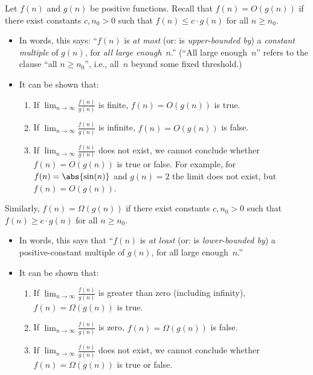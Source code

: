 \documentclass[11pt,addpoints,answers]{exam}
\begin{document}
\begin{questions}
  Let $f(n)$ and $g(n)$ be positive functions.
  Recall that $f(n) = O(g(n))$ if there exist constants $c, n_0 > 0$ such that $f(n) \leq c \cdot g(n)$ for all $n \geq n_0$.

  \begin{itemize}
    \item In words, this says: ``$f(n)$ is \emph{at most} (or: is \emph{upper-bounded by}) a \emph{constant multiple} of $g(n)$, for \emph{all large enough}~$n$.''
    (``All large enough~$n$'' refers to the clause ``all $n \geq n_{0}$'', i.e., all~$n$ beyond some fixed threshold.)

   \item It can be shown that:
    \begin{enumerate}
        \item If $\lim_{n \to \infty} \frac{f(n)}{g(n)}$ is finite, $f(n) = O(g(n))$ is true.
        \item If $\lim_{n \to \infty} \frac{f(n)}{g(n)}$ is infinite, $f(n) = O(g(n))$ is false.
        \item If $\lim_{n \to \infty} \frac{f(n)}{g(n)}$ does not exist, we cannot conclude whether $f(n) = O(g(n))$ is true or false. For example, for $f(n) = \abs{\sin(n)}$ and $g(n)=2$ the limit does not exist, but $f(n)=O(g(n))$.
    \end{enumerate}
  \end{itemize}

   Similarly, $f(n) = \Omega(g(n))$ if there exist constants $c, n_{0} > 0$ such that $f(n) \geq c \cdot g(n)$ for all $n \geq n_{0}$.
  \begin{itemize}
      \item In words, this says that ``$f(n)$ is \emph{at least} (or: is \emph{lower-bounded by}) a positive-constant multiple of $g(n)$, for all large enough~$n$.''
      \item It can be shown that:
      \begin{enumerate}
          \item If $\lim_{n \to \infty} \frac{f(n)}{g(n)}$ is greater than zero (including infinity), $f(n) = \Omega(g(n))$ is true.
          \item If $\lim_{n \to \infty} \frac{f(n)}{g(n)}$ is zero, $f(n) = \Omega(g(n))$ is false.
          \item If $\lim_{n \to \infty} \frac{f(n)}{g(n)}$ does not exist, we cannot conclude whether $f(n) = \Omega(g(n))$ is true or false. 
      \end{enumerate}
  \end{itemize}
  

\end{questions}
\end{document}
